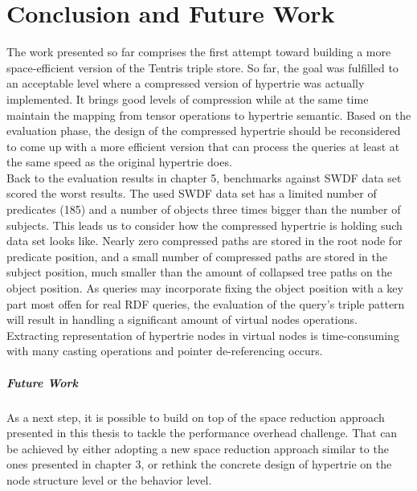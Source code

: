 \chapter{Conclusion and Future Work}
\label{ch:conclusion}

The work presented so far comprises the first attempt toward building a more space-efficient version of the Tentris triple store. So far, the goal was fulfilled to an acceptable level where a compressed version of hypertrie was actually implemented. It brings good levels of compression while at the same time maintain the mapping from tensor operations to hypertrie semantic. Based on the evaluation phase, the design of the compressed hypertrie should be reconsidered to come up with a more efficient version that can process the queries at least at the same speed as the original hypertrie does.\\

Back to the evaluation results in chapter 5, benchmarks against SWDF data set scored the worst results. The used SWDF data set has a limited number of predicates (185) and a number of objects three times bigger than the number of subjects. This leads us to consider how the compressed hypertrie is holding such data set looks like. Nearly zero compressed paths are stored in the root node for predicate position, and a small number of compressed paths are stored in the subject position, much smaller than the amount of collapsed tree paths on the object position. As queries may incorporate fixing the object position with a key part most offen for real RDF queries, the evaluation of the query's triple pattern will result in handling a significant amount of virtual nodes operations. Extracting representation of hypertrie nodes in virtual nodes is time-consuming with many casting operations and pointer de-referencing occurs.

\paragraph{Future Work}
As a next step, it is possible to build on top of the space reduction approach presented in this thesis to tackle the performance overhead challenge. That can be achieved by either adopting a new space reduction approach similar to the ones presented in chapter 3, or rethink the concrete design of hypertrie on the node structure level or the behavior level.